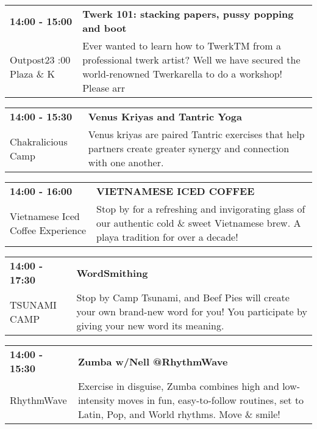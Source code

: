 \begin{tabular}{ p{1in} p{2.2in} }
    \textbf{14:00 - 15:00} & \textbf{Twerk 101: stacking papers, pussy popping and boot} \\
    Outpost23 \newline 6:00 Plaza \& K & Ever wanted to learn how to TwerkTM from a professional twerk artist? Well we have secured the world-renowned Twerkarella to do a workshop! Please arr \\
    \hline 
\end{tabular}
    
\begin{tabular}{ p{1in} p{2.2in} }
    \textbf{14:00 - 15:30} & \textbf{Venus Kriyas and Tantric Yoga} \\
    Chakralicious Camp \newline  & Venus kriyas are paired Tantric exercises that help partners create greater synergy and connection with one another. \\
    \hline 
\end{tabular}
    
\begin{tabular}{ p{1in} p{2.2in} }
    \textbf{14:00 - 16:00} & \textbf{VIETNAMESE ICED COFFEE} \\
    Vietnamese Iced Coffee Experience \newline  & Stop by for a refreshing and invigorating glass of our authentic cold \& sweet Vietnamese brew. A playa tradition for over a decade! \\
    \hline 
\end{tabular}
    
\begin{tabular}{ p{1in} p{2.2in} }
    \textbf{14:00 - 17:30} & \textbf{WordSmithing} \\
    TSUNAMI CAMP \newline  & Stop by Camp Tsunami, and Beef Pies will create your own brand-new word for you! You participate by giving your new word its meaning. \\
    \hline 
\end{tabular}
    
\begin{tabular}{ p{1in} p{2.2in} }
    \textbf{14:00 - 15:30} & \textbf{Zumba w/Nell @RhythmWave} \\
    RhythmWave \newline  & Exercise in disguise, Zumba combines high and low-intensity moves in fun, easy-to-follow routines, set to Latin, Pop, and World rhythms. Move \& smile! \\
    \hline 
\end{tabular}
    
